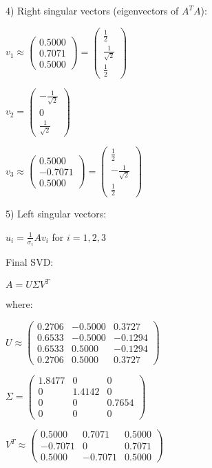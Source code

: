\documentclass[8pt]{article}
\begin{document}
{4) Right singular vectors (eigenvectors of $A^TA$):

   $v_1 \approx \begin{pmatrix} 0.5000 \\ 0.7071 \\ 0.5000 \end{pmatrix} = \begin{pmatrix} \frac{1}{2} \\ \frac{1}{\sqrt{2}} \\ \frac{1}{2} \end{pmatrix}$

   $v_2 = \begin{pmatrix} -\frac{1}{\sqrt{2}} \\ 0 \\ \frac{1}{\sqrt{2}} \end{pmatrix}$

   $v_3 \approx \begin{pmatrix} 0.5000 \\ -0.7071 \\ 0.5000 \end{pmatrix} = \begin{pmatrix} \frac{1}{2} \\ -\frac{1}{\sqrt{2}} \\ \frac{1}{2} \end{pmatrix}$

5) Left singular vectors:

   $u_i = \frac{1}{\sigma_i}Av_i$ for $i = 1, 2, 3$

Final SVD:

$A = U\Sigma V^T$

where:

$U \approx \begin{pmatrix}
0.2706 & -0.5000 & 0.3727 \\
0.6533 & -0.5000 & -0.1294 \\
0.6533 & 0.5000 & -0.1294 \\
0.2706 & 0.5000 & 0.3727
\end{pmatrix}$

$\Sigma = \begin{pmatrix}
1.8477 & 0 & 0 \\
0 & 1.4142 & 0 \\
0 & 0 & 0.7654 \\
0 & 0 & 0
\end{pmatrix}$

$V^T \approx \begin{pmatrix}
0.5000 & 0.7071 & 0.5000 \\
-0.7071 & 0 & 0.7071 \\
0.5000 & -0.7071 & 0.5000
\end{pmatrix}$

}
\end{document}
